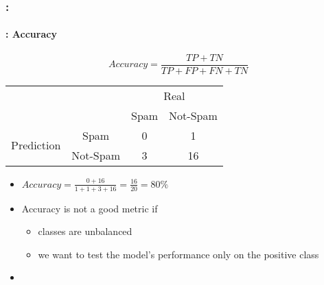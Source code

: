 \documentclass[xcolor=table]{beamer}
\begin{document}
\begin{frame}
	\frametitle{\insertshortsubtitle: \insertsection}
	\framesubtitle{\insertsubsection: Accuracy}
	
	\[Accuracy = \frac{TP + TN}{TP + FP + FN + TN}\]
	
	\begin{tabular}{|c|c|c|c|}
		\cline{3-4}
		\multicolumn{2}{c|}{}& \multicolumn{2}{c|}{Real} \\
		\cline{3-4}
		\multicolumn{2}{c|}{}& Spam & Not-Spam \\
		\hline
		\multirow{2}{*}{Prediction} & Spam & 0 & 1 \\
		\cline{2-4}
		& Not-Spam & 3 & 16 \\
		\hline
	\end{tabular}
	
	\begin{itemize}
		\item $Accuracy = \frac{0 + 16}{1 + 1 + 3 + 16} = \frac{16}{20} = 80\%$
		\item Accuracy is not a good metric if
		\begin{itemize}
			\item classes are unbalanced
			\item we want to test the model's performance only on the positive class
		\end{itemize}
		\item {}
	\end{itemize}
	
\end{frame}
\end{document}

